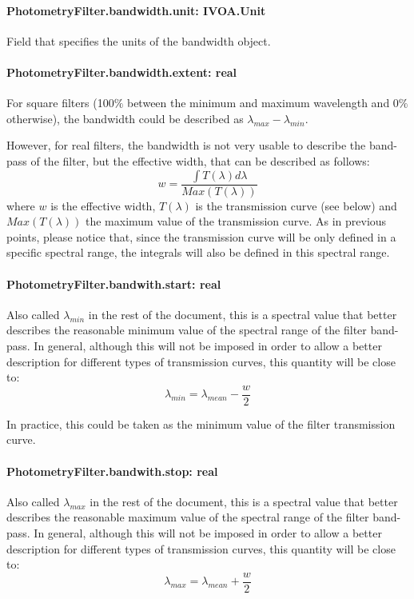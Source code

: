 \documentclass[11pt,a4paper]{ivoa}
\begin{document}
\paragraph{PhotometryFilter.bandwidth.unit: IVOA.Unit}
Field that specifies the units of the bandwidth object.
\par

\paragraph{PhotometryFilter.bandwidth.extent: real}
For square filters (100$\%$  between the minimum and maximum wavelength and 0$\%$  otherwise),
the bandwidth could be described as $\lambda_{max} - \lambda_{min}$.
\par

However, for real filters, the bandwidth is not very usable to describe the band-pass of the
filter, but the effective width, that can be described as follows:
\begin{equation} \label{eq:21}
w = \frac{\int T(\lambda)d\lambda}{Max(T(\lambda))}
\end{equation}
where $w$ is the effective width, $T(\lambda)$ is the transmission curve (see below)
and $Max(T(\lambda))$ the maximum value of the transmission curve. As in previous points,
please notice that, since the transmission curve will be only defined in a specific spectral
range, the integrals will also be defined in this spectral range.
\par

\paragraph{PhotometryFilter.bandwith.start: real}
Also called $\lambda_{min}$ in the rest of the document, this is a spectral value that better describes
the reasonable minimum value of the spectral range of the filter band-pass. In general,
although this
will not be imposed in order to allow a better description for different types of
transmission curves, this quantity will be close to:
\begin{equation} \label{eq:22}
\lambda_{min} = \lambda_{mean} - \frac{w}{2}
\end{equation}

In practice, this could be taken as the minimum value of the filter transmission curve.
\par

\paragraph{PhotometryFilter.bandwith.stop: real}
Also called $\lambda_{max}$ in the rest of the document, this is a spectral value that
better describes the reasonable maximum value of the spectral range of the filter band-pass.
In general,
although this will not be imposed in order to allow a better description for different
types of transmission curves, this quantity will be close to:
\begin{equation} \label{eq:23}
\lambda_{max} = \lambda_{mean} + \frac{w}{2}
\end{equation}
\end{document}

